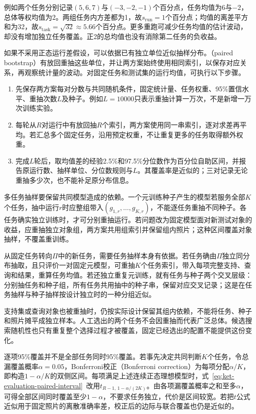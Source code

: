 例如两个任务分别记录$(5,6,7)$与$(-3,-2,-1)$个百分点，任务均值为6与$-2$，总体等权均值为2。两组任务内方差都为1，故$s_{\mathrm{run}}=1$个百分点；均值的离差平方和为32，故$s_{\mathrm{task}}=\sqrt{32}\approx5.66$个百分点。更多重跑可减少任务均值的估计波动，却没有增加独立任务覆盖。正2的总均值也没有消除第二任务的负收益。

如果不采用正态运行差假设，可以依据已有独立单位近似抽样分布。（paired bootstrap）有放回重抽这些单位，并让两方案始终使用相同索引，以保存对应关系，再观察统计量的波动。对固定任务和测试集的运行均值，可执行以下步骤。
\begin{enumerate}
  \item 先保存两方案每对分数与共同随机条件，固定统计量、任务权重、95\%置信水平、重抽次数$L$及种子。例如$L=10000$只表示重抽计算一万次，不是新增一万次训练实验。
  \item 每轮从$R$对运行中有放回抽$R$个索引，两方案使用同一串索引，逐对求差再平均。若汇总多个固定任务，沿用预定权重，不让重复更多的任务取得额外权重。
  \item 完成$L$轮后，取均值差的经验2.5\%和97.5\%分位数作为百分位自助区间，并报告原运行数、抽样单位、分位数规则与$L$。其覆盖率是近似的；三对记录无论重抽多少次，也不能补足原分布信息。
\end{enumerate}

多任务抽样要保留共同模型造成的依赖。一个元训练种子产生的模型若服务全部$K$个任务，抽中运行$r$时应整组带入$(g_{1,r},\ldots,g_{K,r})$，不能逐任务重抽不同种子。各任务确实独立训练时，才可分别重抽运行。若问题改为固定模型面对新测试对象的收益，应重抽独立对象组，两方案共用组索引并保留组内照片；这种区间覆盖对象抽样，不覆盖重训练。

从固定任务转向$\Pi$中的新任务，需要任务抽样本身有依据。若任务确由$\Pi$独立同分布抽取，且只评价一对固定元模型，可重抽$K$个任务索引，带入每项完整支持、查询和结果，重算任务均值。若还独立重复元训练，就有任务与种子两个交叉层级：分别抽任务和种子组，所有任务共用抽中的种子串，保留对应交叉记录；这是在任务抽样与种子抽样按设计独立时的一种分组近似。

支持集或查询对象也被重抽时，仍按实际设计保留其组内依赖，不能将任务、种子和照片摊平成独立样本。人工选出的两个任务不会因重抽而代表广泛总体。候选搜索随机性也只有重复整个选择过程才被覆盖，固定已经选出的配置不能提供这份变化。

逐项95\%覆盖并不是全部任务同时95\%覆盖。若事先决定共同判断$K$个任务，令总漏覆盖概率$\alpha=0.05$，Bonferroni校正（Bonferroni correction）为每项分配$\alpha/K$，即构造$1-\alpha/K$的双侧区间。每项满足上述连续正态理想模型时，式~\eqref{eq:ket-evaluation-paired-interval}~改用$t_{R-1,\,1-\alpha/(2K)}$。由各项漏覆盖概率之和至多$\alpha$，可得全部区间同时覆盖至少$1-\alpha$，不要求任务独立，代价是区间较宽。若把$t$公式近似用于固定照片的离散准确率差，校正后的边际与联合覆盖也仍是近似的。

